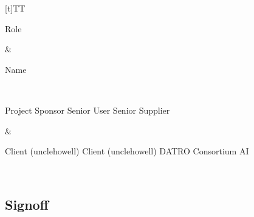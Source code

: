 \documentclass[letterpaper,10pt,openany,oneside,english]{sphinxmanual}
\begin{document}
\begin{savenotes}\sphinxattablestart
\sphinxthistablewithglobalstyle
\centering
\begin{tabulary}{\linewidth}[t]{TT}
\sphinxtoprule
\begin{varwidth}[t]{}
\sphinxstyletheadfamily \sphinxAtStartPar
Role
\sphinxbeforeendvarwidth
\end{varwidth}%
&\begin{varwidth}[t]{}
\sphinxstyletheadfamily \sphinxAtStartPar
Name
\sphinxbeforeendvarwidth
\end{varwidth}%
\\
\sphinxmidrule
\sphinxtableatstartofbodyhook\begin{varwidth}[t]{}
\sphinxAtStartPar
Project Sponsor
Senior User
Senior Supplier
\sphinxbeforeendvarwidth
\end{varwidth}%
&\begin{varwidth}[t]{}
\sphinxAtStartPar
Client (unclehowell)
Client (unclehowell)
DATRO Consortium \sphinxhyphen{} AI
\sphinxbeforeendvarwidth
\end{varwidth}%
\\
\sphinxbottomrule
\end{tabulary}
\sphinxtableafterendhook\par
\sphinxattableend\end{savenotes}


\subsection{Sign\sphinxhyphen{}off}
\label{\detokenize{approval:sign-off}}
\end{document}
